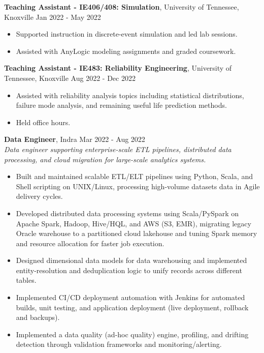 \documentclass[10pt, letterpaper]{article}
\newenvironment{highlights}{
    \begin{itemize}[
        topsep=0.10 cm,
        parsep=0.10 cm,
        partopsep=0pt,
        itemsep=0pt,
        leftmargin=0 cm + 10pt
    ]
}{
    \end{itemize}
} %
\begin{document}
\vspace{0.2cm}
\noindent\textbf{Teaching Assistant - IE406/408: Simulation}, University of Tennessee, Knoxville \hfill Jan 2022 - May 2022
\begin{highlights}
    \item Supported instruction in discrete-event simulation and led lab sessions.
    \item Assisted with AnyLogic modeling assignments and graded coursework.
\end{highlights}

\vspace{0.2cm}
\noindent\textbf{Teaching Assistant - IE483: Reliability Engineering}, University of Tennessee, Knoxville \hfill Aug 2022 - Dec 2022
\begin{highlights}
    \item Assisted with reliability analysis topics including statistical distributions, failure mode analysis, and remaining useful life prediction methods.
    \item Held office hours.
\end{highlights}

\vspace{0.2cm}
\noindent\textbf{Data Engineer}, Indra \hfill Mar 2022 - Aug 2022\\
\textit{Data engineer supporting enterprise-scale ETL pipelines, distributed data processing, and cloud migration for large-scale analytics systems.}
\begin{highlights}
    \item Built and maintained scalable ETL/ELT pipelines using Python, Scala, and Shell scripting on UNIX/Linux, processing high-volume datasets data in Agile delivery cycles.
    \item Developed distributed data processing systems using Scala/PySpark on Apache Spark, Hadoop, Hive/HQL, and AWS (S3, EMR), migrating legacy Oracle warehouse to a partitioned cloud lakehouse and tuning Spark memory and resource allocation for faster job execution.
    \item Designed dimensional data models for data warehousing and implemented entity-resolution and deduplication logic to unify records across different tables.
    \item Implemented CI/CD deployment automation with Jenkins for automated builds, unit testing, and application deployment (live deployment, rollback and backups).
    \item Implemented a data quality (ad-hoc quality) engine, profiling, and drifting detection through validation frameworks and monitoring/alerting.
\end{highlights}
\end{document}

